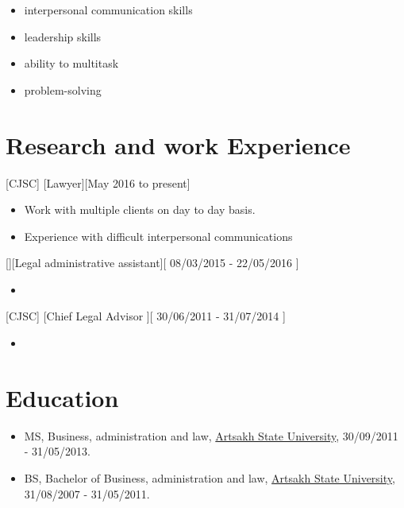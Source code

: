 \documentclass{article}
\begin{document}
\begin{itemize}
\item interpersonal communication skills
\item leadership skills
\item ability to multitask
\item problem-solving 
\end{itemize}

\section{Research and work Experience}
 

 
[CJSC]
[Lawyer][May 2016 to present]
   \begin{itemize}
   \item Work  with multiple clients on day to day basis.
   \item  Experience with difficult interpersonal communications
   \end{itemize}

[][Legal administrative assistant][ 08/03/2015 - 22/05/2016 ]
\begin{itemize}
   \item 
   \end{itemize}

[CJSC]
[Chief Legal Advisor ][ 30/06/2011 - 31/07/2014 ]

\begin{itemize}
\item 
\end{itemize}
 

 
 
\section{Education}
 
\begin{itemize}
\item MS, Business, administration and law, \href{http://www.asu.am/}{Artsakh State University},  30/09/2011 - 31/05/2013.
\item BS, Bachelor of Business, administration and law, \href{http://www.asu.am/}{Artsakh State University}, 31/08/2007 - 31/05/2011.
\end{itemize}
\end{document}
